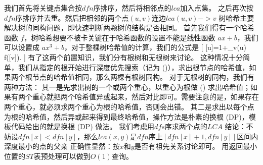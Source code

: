 {}我们首先将关键点集合按$ dfn $序排序，然后将相邻点的$ lca $加入点集。\markdownRendererParagraphSeparator
{}之后再次按$ dfn $序排序并去重。然后把相邻的两个点$ (u,v) $连边$ lca(u,v)->v $\markdownRendererInterblockSeparator
{}\markdownRendererInterblockSeparator
{}
\markdownRendererSectionEnd \markdownRendererSectionBegin
{}\markdownRendererInterblockSeparator
{}树哈希主要解决树的同构问题，即快速判断两颗树的结构是否相同。\markdownRendererParagraphSeparator
{}首先我们得有一个哈希函数 $f$，树哈希想要不被卡关键在于哈希函数的设置不能是线性函数 $ax+b$，我们可以设置成 $ax^3+b$，对于整棵树哈希值的计算，我们的公式是\markdownRendererSoftLineBreak
{}[\markdownRendererSoftLineBreak
{}[u]=1+\sum_{v\in {}(u)} f([v]).\markdownRendererSoftLineBreak
{}]\markdownRendererParagraphSeparator
{}有了这两个前置知识，我们分有根树和无根树来讨论。\markdownRendererParagraphSeparator
{} 这种情况十分简单，我们从指定的根开始进行深度优先搜索（记为 ()），求出根节点的哈希值，如果两个根节点的哈希值相同，那么两棵有根树同构。\markdownRendererParagraphSeparator
{} 对于无根树的同构，我们有两种方法：\markdownRendererParagraphSeparator
{}其一是先求出树的一个或两个重心，以重心为根做 () 求出哈希值；如果有两个重心就把两个哈希值异或起来，然后对比即可。需要注意的是，如果存在两个重心，就必须求两个重心为根的哈希值，否则会出错。\markdownRendererHardLineBreak
{}其二是求出以每个点为根的哈希值，然后异或起来得到最终哈希值，操作方法是朴素的换根 (DP)，模板代码给出的就是换根 (DP) 做法。\markdownRendererInterblockSeparator
{}\markdownRendererInterblockSeparator
{}
\markdownRendererSectionEnd \markdownRendererSectionBegin
{}\markdownRendererInterblockSeparator
{}我们考虑用$ dfs $序求两个点的$ LCA $\markdownRendererParagraphSeparator
{}结论：不妨设$ dfn[x]<dfn[y] $，那么$ lca(x,y) $是$ dfn $序上$ [dfn[x]+1,dfn[y]] $区间内深度最小的点的父亲\markdownRendererParagraphSeparator
{}正确性显然：按$ x和y $是否有祖先关系讨论即可。\markdownRendererParagraphSeparator
{}用返回最小位置的$ ST $表预处理可以做到$ O(1) $查询。\markdownRendererInterblockSeparator
{}\markdownRendererInterblockSeparator
